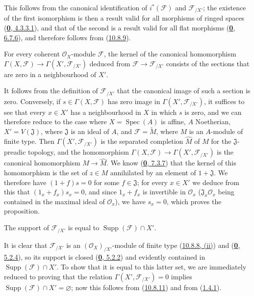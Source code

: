 This follows from the canonical identification of $i^*(\mathscr{F})$ and
$\mathscr{F}_{/X'}$; the existence of the first isomorphism is then a
result valid for all morphisms of ringed spaces
(\hyperref[0.4.3.3.1]{\textbf{0}, 4.3.3.1}), and that of the second is a result
valid for all flat morphisms
(\hyperref[0.6.7.6]{\textbf{0}, 6.7.6}), and therefore follows from
(\hyperref[I.10.8.9]{10.8.9}).

\begin{proposition}[10.8.11]
\label{I.10.8.11}
For every coherent $\mathscr{O}_X$-module $\mathscr{F}$, the kernel of
the canonical homomorphism
$\Gamma(X,\mathscr{F})\to\Gamma(X',\mathscr{F}_{/X'})$ deduced from
$\mathscr{F}\to\mathscr{F}_{/X'}$ consists of the sections that are zero
in a neighbourhood of $X'$.
\end{proposition}

It follows from the definition of $\mathscr{F}_{/X'}$ that the canonical
image of such a section is zero. Conversely, if
$s\in\Gamma(X,\mathscr{F})$ has zero image in
$\Gamma(X',\mathscr{F}_{/X'})$, it suffices to see that every $x\in X'$
has a neighbourhood in $X$ in which $s$ is zero, and we can therefore
reduce to the case where $X=\operatorname{Spec}(A)$ is affine, $A$
Noetherian, $X'=V(\mathfrak{J})$, where $\mathfrak{J}$ is an ideal of
$A$, and $\mathscr{F}=\widetilde M$, where $M$ is an $A$-module of finite
type. Then $\Gamma(X',\mathscr{F}_{/X'})$ is the separated completion
$\widehat M$ of $M$ for the $\mathfrak{J}$-preadic topology, and the
homomorphism $\Gamma(X,\mathscr{F})\to\Gamma(X',\mathscr{F}_{/X'})$ is
the canonical homomorphism $M\to\widehat M$. We know
(\hyperref[0.7.3.7]{\textbf{0}, 7.3.7}) that the kernel of this homomorphism is
the set of $z\in M$ annihilated by an element of $1+\mathfrak{J}$. We
therefore have $(1+f)s=0$ for some $f\in\mathfrak{J}$; for every
$x\in X'$ we deduce from this that $(1_x+f_x)s_x=0$, and since $1_x+f_x$
is invertible in $\mathscr{O}_x$ ($\mathfrak{J}_x\mathscr{O}_x$ being
contained in the maximal ideal of $\mathscr{O}_x$), we have $s_x=0$,
which proves the proposition.

\begin{corollary}[10.8.12]
\label{I.10.8.12}
The support of $\mathscr{F}_{/X'}$ is equal to
$\operatorname{Supp}(\mathscr{F})\cap X'$.
\end{corollary}

It is clear that $\mathscr{F}_{/X'}$ is an
$(\mathscr{O}_X)_{/X'}$-module of finite type
(\hyperref[I.10.8.8]{10.8.8, (ii)}) and
(\hyperref[0.5.2.4]{\textbf{0}, 5.2.4}),
so its support is closed (\hyperref[0.5.2.2]{\textbf{0}, 5.2.2}) and
evidently contained in $\operatorname{Supp}(\mathscr{F})\cap X'$. To
show that it is equal to this latter set, we are immediately reduced to
proving that the relation $\Gamma(X',\mathscr{F}_{/X'})=0$ implies
$\operatorname{Supp}(\mathscr{F})\cap X'=\varnothing$; now this follows
from (\hyperref[I.10.8.11]{10.8.11}) and from
(\hyperref[I.1.4.1]{1.4.1}).

